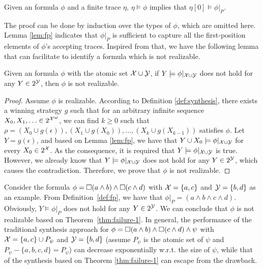 \begin{lemma}\label{lem:fp}
Given an \ltlf formula $\phi$ and a finite trace $\eta$, $\eta\models\phi$ implies that $\eta[0]\models\phi|_P$.
\end{lemma}
The proof can be done by induction over the types of $\phi$, which are omitted here. Lemma \ref{lem:fp} indicates that $\phi|_P$ is sufficient to capture all the first-position elements of $\phi$'s accepting traces. Inspired from that, we have the following lemma that can facilitate to identify a formula which is not realizable. 

\begin{theorem}\label{thm:failure-1}
Given an \ltlf formula $\phi$ with the atomic set $\mathcal{X}\cup \mathcal{Y}$, if $Y\models \phi|_{\mathcal{X}\cup\mathcal{Y}}$ does not hold for any $Y\in 2^{\mathcal{Y}}$, then $\phi$ is not realizable. 
\end{theorem}
\begin{proof}
Assume $\phi$ is realizable. According to Definition \ref{def:synthesis}, there exists a winning strategy $g$ such that for an arbitrary infinite sequence $X_0,X_1,\ldots\in {2^{\mathcal{X}}}^{\omega}$, we can find $k\geq 0$ such that $\rho=(X_0\cup g(\epsilon)),(X_1\cup g(X_0)), \ldots, (X_k\cup g(X_{k-1}))$ satisfies $\phi$. Let $Y = g(\epsilon)$, and based on Lemma \ref{lem:fp}, we have that $Y\cup X_0\models \phi|_{\mathcal{X}\cup\mathcal{Y}}$ for every $X_0\in 2^{\mathcal{X}}$. As the consequence, it is required that $Y\models \phi|_{\mathcal{X}\cup\mathcal{Y}}$ is true. However, we already know that $Y\models \phi|_{\mathcal{X}\cup\mathcal{Y}}$ does not hold for any $Y\in 2^{\mathcal{Y}}$, which causes the contradiction. Therefore, we prove that $\phi$ is not realizable.
\end{proof}

Consider the formula $\phi= \Box (a\wedge b)\wedge \Box (c\wedge d)$ with $\mathcal{X}=\{a,c\}$ and $\mathcal{Y}=\{b,d\}$ as an example. From Definition~\ref{def:fp}, we have that $\phi|_P=(a\wedge b\wedge c\wedge d)$. Obviously, $Y\models \phi|_P$ does not hold for any $Y\in 2^{\mathcal{Y}}$. We can conclude that $\phi$ is not realizable based on Theorem~\ref{thm:failure-1}. In general, the performance of the traditional synthesis approach for $\phi= \Box (a\wedge b)\wedge \Box (c\wedge d) \wedge\psi$ with $\mathcal{X}=\{a,c\}\cup P_{\psi}$ and $\mathcal{Y}=\{b,d\}$ (assume $P_{\psi}$ is the atomic set of $\psi$ and $P_{\psi} - \{a,b,c,d\} = P_{\psi}$) can decrease exponentially w.r.t. the size of $\psi$, while that of the synthesis based on Theorem \ref{thm:failure-1} can escape from the drawback. 

